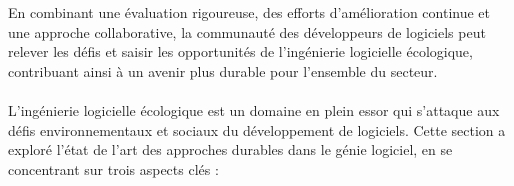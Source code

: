 En combinant une évaluation rigoureuse, des efforts d'amélioration continue et une approche collaborative, la communauté des développeurs de logiciels peut relever les défis et saisir les opportunités de l'ingénierie logicielle écologique, contribuant ainsi à un avenir plus durable pour l'ensemble du secteur.


\paragraph{}
L'ingénierie logicielle écologique est un domaine en plein essor qui s'attaque aux défis environnementaux et sociaux du développement de logiciels. Cette section a exploré l'état de l'art des approches durables dans le génie logiciel, en se concentrant sur trois aspects clés :

